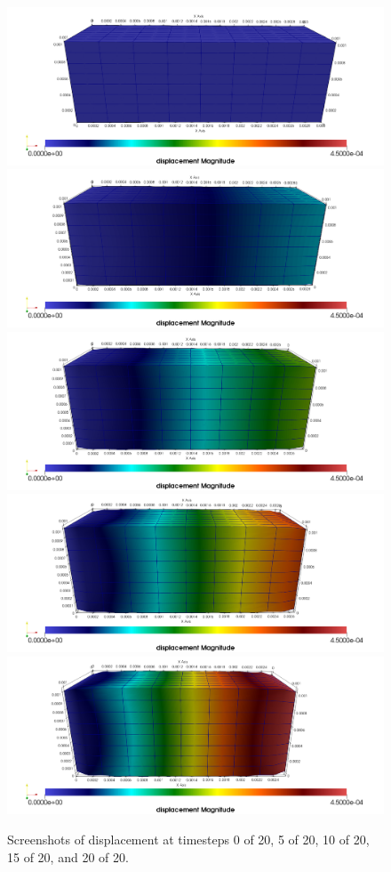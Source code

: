 \documentclass[letterpaper,11pt,oneside,titlepage]{report}
\begin{document}
{\begin{figure}
  \centering
  \includegraphics[height=0.18\textheight]{figs/00-u.png}
  \includegraphics[height=0.18\textheight]{figs/05-u.png}
  \includegraphics[height=0.18\textheight]{figs/10-u.png}
  \includegraphics[height=0.18\textheight]{figs/15-u.png}
  \includegraphics[height=0.18\textheight]{figs/20-u.png}
  \caption{Screenshots of displacement at timesteps 0 of 20, 5 of 20, 10 of 20, 15 of 20, and 20 of 20.}
\end{figure}

}
\end{document}
